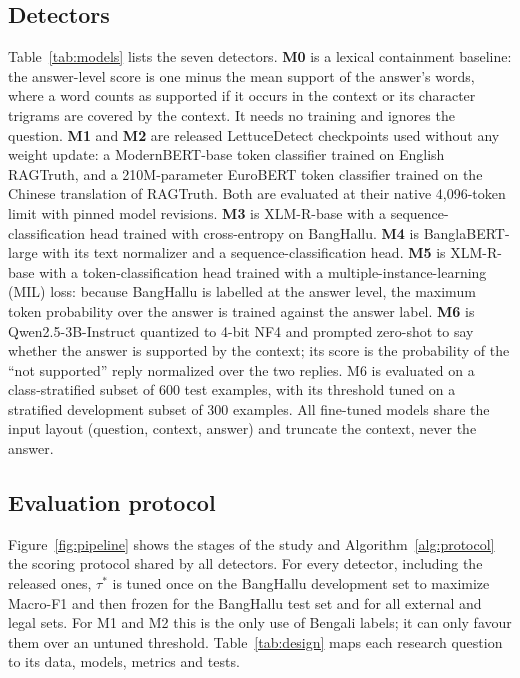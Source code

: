 \documentclass[manuscript,screen,review]{acmart}
\newcommand{\fit}[1]{\resizebox{\ifdim\width>\linewidth\linewidth\else\width\fi}{!}{#1}}
\begin{document}
\subsection{Detectors}
Table~\ref{tab:models} lists the seven detectors. \textbf{M0} is a lexical containment baseline: the answer-level score is one minus the mean support of the answer's words, where a word counts as supported if it occurs in the context or its character trigrams are covered by the context. It needs no training and ignores the question. \textbf{M1} and \textbf{M2} are released LettuceDetect checkpoints used without any weight update: a ModernBERT-base token classifier trained on English RAGTruth, and a 210M-parameter EuroBERT token classifier trained on the Chinese translation of RAGTruth. Both are evaluated at their native 4,096-token limit with pinned model revisions. \textbf{M3} is XLM-R-base \cite{conneau2020xlmr} with a sequence-classification head trained with cross-entropy on BangHallu. \textbf{M4} is BanglaBERT-large \cite{bhattacharjee2022banglabert} with its text normalizer and a sequence-classification head. \textbf{M5} is XLM-R-base with a token-classification head trained with a multiple-instance-learning (MIL) loss: because BangHallu is labelled at the answer level, the maximum token probability over the answer is trained against the answer label. \textbf{M6} is Qwen2.5-3B-Instruct \cite{qwen2025qwen25} quantized to 4-bit NF4 \cite{dettmers2023qlora} and prompted zero-shot to say whether the answer is supported by the context; its score is the probability of the ``not supported'' reply normalized over the two replies. M6 is evaluated on a class-stratified subset of 600 test examples, with its threshold tuned on a stratified development subset of 300 examples. All fine-tuned models share the input layout (question, context, answer) and truncate the context, never the answer.

\begin{table}[t]
\caption{Detectors. ``Released'' models are used without any weight update; ``BH'' is the cleaned BangHallu training split. M5, not M3, is the XLM-R reference in the analyses (Section~\ref{sec:adapt}).}
\label{tab:models}
\small
\fit{}
\end{table}

\subsection{Evaluation protocol}
Figure~\ref{fig:pipeline} shows the stages of the study and Algorithm~\ref{alg:protocol} the scoring protocol shared by all detectors. For every detector, including the released ones, $\tau^*$ is tuned once on the BangHallu development set to maximize Macro-F1 and then frozen for the BangHallu test set and for all external and legal sets. For M1 and M2 this is the only use of Bengali labels; it can only favour them over an untuned threshold. Table~\ref{tab:design} maps each research question to its data, models, metrics and tests.
\end{document}
